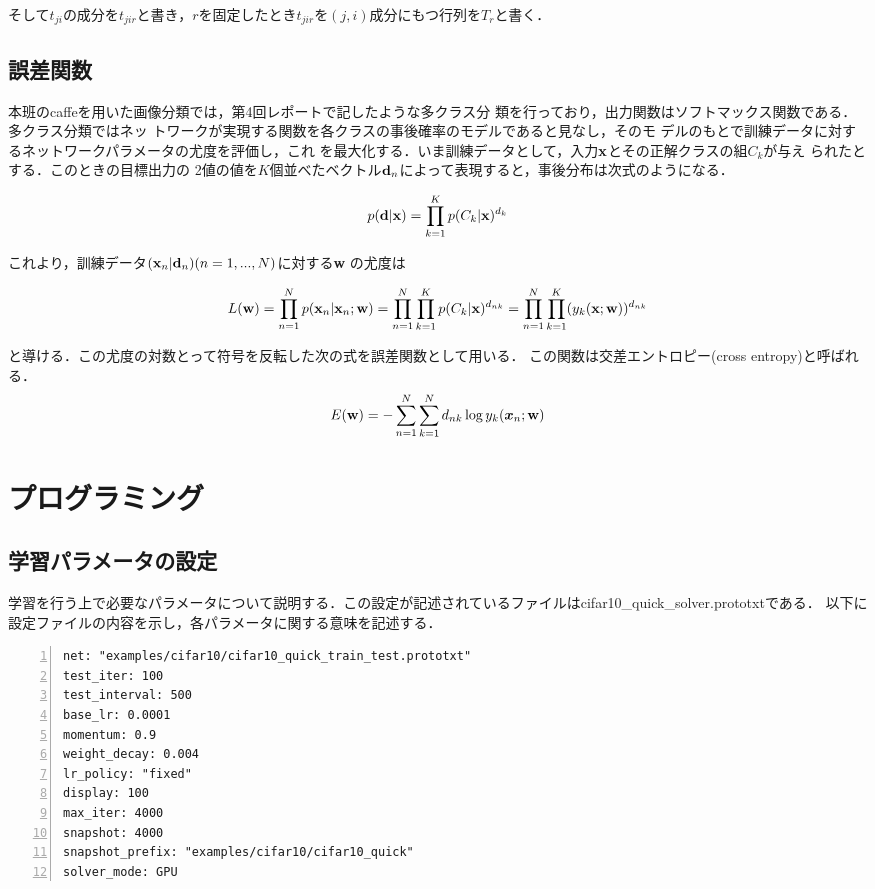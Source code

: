 \documentclass[a4paper,10pt]{jsarticle}
\def\vec#1{\mbox{\boldmath$#1$}}
\begin{document}
そして$t_{ji}$の成分を$t_{jir}$と書き，$r$を固定したとき$t_{jir}$を$(j,i)$成分にもつ行列を$T_r$と書く．

\subsection{誤差関数}
本班のcaffeを用いた画像分類では，第4回レポートで記したような多クラス分
類を行っており，出力関数はソフトマックス関数である．多クラス分類ではネッ
トワークが実現する関数を各クラスの事後確率のモデルであると見なし，そのモ
デルのもとで訓練データに対するネットワークパラメータの尤度を評価し，これ
を最大化する．いま訓練データとして，入力${\bf x}$とその正解クラスの組$C_k$が与え
られたとする．このときの目標出力の
2値の値を$K$個並べたベクトル${\bf
d}_n$によって表現すると，事後分布は次式のようになる．

\begin{equation}
 p({\bf d}|{\bf x}) = \prod_{k=1}^{K}p(C_k|{\bf x})^{d_k}
\end{equation}

これより，訓練データ${({\bf x}_n|{\bf d}_n)}(n=1,...,N)$に対する{\bf w}
の尤度は

\begin{equation}
 L({\bf w})=\prod_{n=1}^{N}p({\bf x}_n|{\bf x}_n;{\bf
	w})=\prod_{n=1}^{N}\prod_{k=1}^{K}p(C_k|{\bf
	x})^{d_{nk}}=\prod_{n=1}^{N}\prod_{k=1}^{K}(y_k({\bf x};{\bf w}))^{d_{nk}}
\end{equation}

と導ける．この尤度の対数とって符号を反転した次の式を誤差関数として用いる．
この関数は交差エントロピー(cross entropy)と呼ばれる．
\begin{eqnarray}
 E({\bf w})=-\sum^{N}_{n=1}\sum^{N}_{k=1}d_{nk}\log
	y_{k}(\vec{x}_{n};{\bf w})
\end{eqnarray}


\section{プログラミング}
\subsection{学習パラメータの設定}
学習を行う上で必要なパラメータについて説明する．この設定が記述されているファイルはcifar10\_quick\_solver.prototxtである．
以下に設定ファイルの内容を示し，各パラメータに関する意味を記述する．

\begin{lstlisting}[basicstyle=\ttfamily\footnotesize, frame=single, firstnumber=1, numbers=left, breaklines=true]
net: "examples/cifar10/cifar10_quick_train_test.prototxt"
test_iter: 100
test_interval: 500
base_lr: 0.0001
momentum: 0.9
weight_decay: 0.004
lr_policy: "fixed"
display: 100
max_iter: 4000
snapshot: 4000
snapshot_prefix: "examples/cifar10/cifar10_quick"
solver_mode: GPU
\end{lstlisting}
\end{document}
